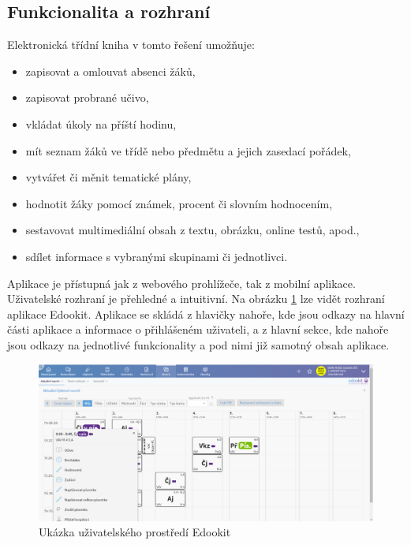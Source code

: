 \subsection{Funkcionalita a rozhraní}
Elektronická třídní kniha v tomto řešení umožňuje:

\begin{itemize}
    \item zapisovat a omlouvat absenci žáků,
    \item zapisovat probrané učivo,
    \item vkládat úkoly na příští hodinu,
    \item mít seznam žáků ve třídě nebo předmětu a jejich zasedací pořádek,
    \item vytvářet či měnit tematické plány,
    \item hodnotit žáky pomocí známek, procent či slovním hodnocením,
    \item sestavovat multimediální obsah z textu, obrázku, online testů, apod.,
    \item sdílet informace s vybranými skupinami či jednotlivci.
\end{itemize}

Aplikace je přístupná jak z webového prohlížeče, tak z mobilní aplikace. Uživatelské rozhraní je přehledné a intuitivní. Na obrázku \ref{edookit} lze vidět rozhraní aplikace Edookit. Aplikace se skládá z hlavičky nahoře, kde jsou odkazy na hlavní části aplikace a informace o přihlášeném uživateli, a z hlavní sekce, kde nahoře jsou odkazy na jednotlivé funkcionality a pod nimi již samotný obsah aplikace.

\begin{figure}[h]
	\centering
	\includegraphics[width=\textwidth]{images/edookit.png}
	\caption{Ukázka uživatelského prostředí Edookit \cite{edookit}}
	\label{edookit}
\end{figure}

